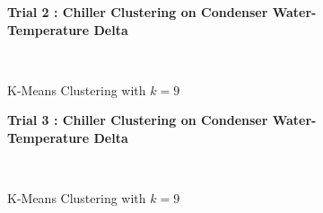 \begin{figure}[!h]
\centerline{\bfseries\Large Trial 2 : Chiller Clustering on Condenser Water-Temperature Delta}\\
\caption{K-Means Clustering with $k=9$}
\end{figure}
\begin{figure}[!h]
\centerline{\bfseries\Large Trial 3 : Chiller Clustering on Condenser Water-Temperature Delta}\\
\caption{K-Means Clustering with $k=9$}
\end{figure}
